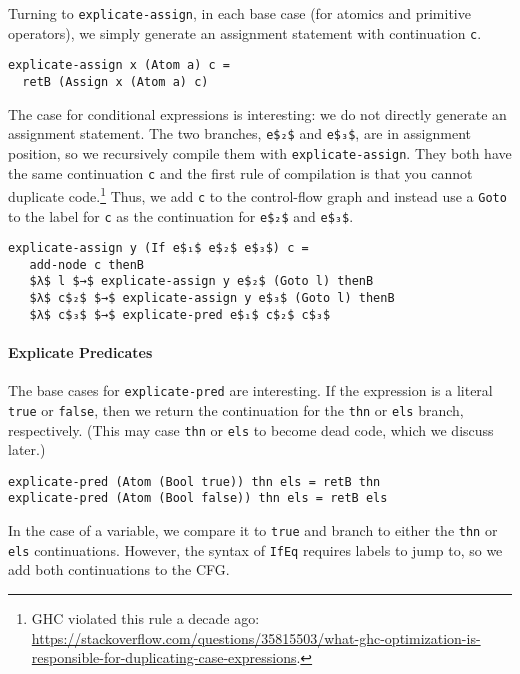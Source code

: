 \documentclass[sigplan,review,dvipsnames,screen,10pt]{acmart}
\begin{document}
Turning to \lstinline{explicate-assign}, in each base case (for
atomics and primitive operators), we simply generate an assignment
statement with continuation \lstinline{c}.

\begin{lstlisting}
explicate-assign x (Atom a) c =
  retB (Assign x (Atom a) c)
\end{lstlisting}

The case for conditional expressions is interesting: we do not
directly generate an assignment statement. The two branches,
\lstinline{e$₂$} and \lstinline{e$₃$}, are in assignment position,
so we recursively compile them with \lstinline{explicate-assign}.
They both have the same continuation \lstinline{c} and the first rule
of compilation is that you cannot duplicate code.\footnote{GHC
violated this rule a decade ago:
\url{https://stackoverflow.com/questions/35815503/what-ghc-optimization-is-responsible-for-duplicating-case-expressions}.}
Thus, we add \lstinline{c} to the control-flow graph and
instead use a \lstinline{Goto} to the label for \lstinline{c}
as the continuation for \lstinline{e$₂$} and \lstinline{e$₃$}.

\begin{lstlisting}
explicate-assign y (If e$₁$ e$₂$ e$₃$) c =
   add-node c thenB
   $λ$ l $→$ explicate-assign y e$₂$ (Goto l) thenB
   $λ$ c$₂$ $→$ explicate-assign y e$₃$ (Goto l) thenB
   $λ$ c$₃$ $→$ explicate-pred e$₁$ c$₂$ c$₃$
\end{lstlisting}

\paragraph{Explicate Predicates}

The base cases for \lstinline{explicate-pred} are interesting.  If the
expression is a literal \lstinline{true} or \lstinline{false}, then we
return the continuation for the \lstinline{thn} or \lstinline{els}
branch, respectively. (This may case \lstinline{thn} or
\lstinline{els} to become dead code, which we discuss later.)

\begin{lstlisting}
explicate-pred (Atom (Bool true)) thn els = retB thn
explicate-pred (Atom (Bool false)) thn els = retB els
\end{lstlisting}

\noindent In the case of a variable, we compare it to \lstinline{true}
and branch to either the \lstinline{thn} or \lstinline{els}
continuations. However, the syntax of \lstinline{IfEq} requires labels
to jump to, so we add both continuations to the CFG.
\end{document}
